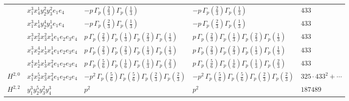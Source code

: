 \documentclass[11pt]{article}
\begin{document}
\begin{table}[ht]
{\begin{tabular}{@{}lllll@{}}
 & $x_{1}^{3} x_{4}^{1} y_{2}^{2} y_{3}^{2} e_{1} e_{4}$ & $- p \, \Gamma_p \left( \frac{2}{3} \right) \Gamma_p \left( \frac{1}{3} \right)$ & $- p \, \Gamma_p \left( \frac{2}{3} \right) \Gamma_p \left( \frac{1}{3} \right)$ & $433$ \\
 & $x_{1}^{3} x_{4}^{1} y_{2}^{4} y_{3}^{1} e_{1} e_{4}$ & $- p \, \Gamma_p \left( \frac{2}{3} \right) \Gamma_p \left( \frac{1}{3} \right)$ & $- p \, \Gamma_p \left( \frac{2}{3} \right) \Gamma_p \left( \frac{1}{3} \right)$ & $433$ \\
 & $x_{1}^{3} x_{2}^{2} x_{3}^{2} x_{4}^{1}  e_{1} e_{2} e_{3} e_{4}$ & $p \, \Gamma_p \left( \frac{2}{3} \right) \Gamma_p \left( \frac{1}{3} \right) \Gamma_p \left( \frac{2}{3} \right) \Gamma_p \left( \frac{1}{3} \right)$ & $p \, \Gamma_p \left( \frac{2}{3} \right) \Gamma_p \left( \frac{1}{3} \right) \Gamma_p \left( \frac{2}{3} \right) \Gamma_p \left( \frac{1}{3} \right)$ & $433$ \\
 & $x_{1}^{3} x_{2}^{4} x_{3}^{1} x_{4}^{1}  e_{1} e_{2} e_{3} e_{4}$ & $p \, \Gamma_p \left( \frac{2}{3} \right) \Gamma_p \left( \frac{2}{3} \right) \Gamma_p \left( \frac{1}{3} \right) \Gamma_p \left( \frac{1}{3} \right)$ & $p \, \Gamma_p \left( \frac{2}{3} \right) \Gamma_p \left( \frac{2}{3} \right) \Gamma_p \left( \frac{1}{3} \right) \Gamma_p \left( \frac{1}{3} \right)$ & $433$ \\
 & $x_{1}^{4} x_{2}^{1} x_{3}^{1} x_{4}^{2}  e_{1} e_{2} e_{3} e_{4}$ & $p \, \Gamma_p \left( \frac{5}{6} \right) \Gamma_p \left( \frac{1}{6} \right) \Gamma_p \left( \frac{1}{3} \right) \Gamma_p \left( \frac{2}{3} \right)$ & $p \, \Gamma_p \left( \frac{5}{6} \right) \Gamma_p \left( \frac{1}{6} \right) \Gamma_p \left( \frac{1}{3} \right) \Gamma_p \left( \frac{2}{3} \right)$ & $433$ \\
\midrule
$H^{2,0}$ & $x_{1}^{4} x_{2}^{5} x_{3}^{2} x_{4}^{2}  e_{1} e_{2} e_{3} e_{4}$ & $- p^{2} \, \Gamma_p \left( \frac{5}{6} \right) \Gamma_p \left( \frac{5}{6} \right) \Gamma_p \left( \frac{2}{3} \right) \Gamma_p \left( \frac{2}{3} \right)$ & $- p^{2} \, \Gamma_p \left( \frac{5}{6} \right) \Gamma_p \left( \frac{5}{6} \right) \Gamma_p \left( \frac{2}{3} \right) \Gamma_p \left( \frac{2}{3} \right)$ & $325{\cdot}433^{2}{+}\cdots$ \\
\midrule
$H^{2,2}$ & $y_{1}^{3} y_{2}^{5} y_{3}^{2} y_{4}^{3}$ & $p^{2} \,$ & $p^{2} \,$ & $187489$ \\
\bottomrule
\end{tabular}
}
\renewcommand{\arraystretch}{1.0}
\end{table}
\end{document}
